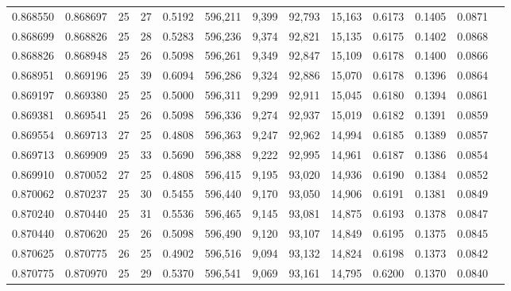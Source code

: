 \begin{tabular}{rrrrrrrrrrrrr}
0.868550 & 0.868697 &    25 &  27 &                                     0.5192 & 596,211 &   9,399 &  92,793 &  15,163 & 0.6173 & 0.1405 & 0.0871 \\
0.868699 & 0.868826 &    25 &  28 &                                     0.5283 & 596,236 &   9,374 &  92,821 &  15,135 & 0.6175 & 0.1402 & 0.0868 \\
0.868826 & 0.868948 &    25 &  26 &                                     0.5098 & 596,261 &   9,349 &  92,847 &  15,109 & 0.6178 & 0.1400 & 0.0866 \\
0.868951 & 0.869196 &    25 &  39 &                                     0.6094 & 596,286 &   9,324 &  92,886 &  15,070 & 0.6178 & 0.1396 & 0.0864 \\
0.869197 & 0.869380 &    25 &  25 &                                     0.5000 & 596,311 &   9,299 &  92,911 &  15,045 & 0.6180 & 0.1394 & 0.0861 \\
0.869381 & 0.869541 &    25 &  26 &                                     0.5098 & 596,336 &   9,274 &  92,937 &  15,019 & 0.6182 & 0.1391 & 0.0859 \\
0.869554 & 0.869713 &    27 &  25 &                                     0.4808 & 596,363 &   9,247 &  92,962 &  14,994 & 0.6185 & 0.1389 & 0.0857 \\
0.869713 & 0.869909 &    25 &  33 &                                     0.5690 & 596,388 &   9,222 &  92,995 &  14,961 & 0.6187 & 0.1386 & 0.0854 \\
0.869910 & 0.870052 &    27 &  25 &                                     0.4808 & 596,415 &   9,195 &  93,020 &  14,936 & 0.6190 & 0.1384 & 0.0852 \\
0.870062 & 0.870237 &    25 &  30 &                                     0.5455 & 596,440 &   9,170 &  93,050 &  14,906 & 0.6191 & 0.1381 & 0.0849 \\
0.870240 & 0.870440 &    25 &  31 &                                     0.5536 & 596,465 &   9,145 &  93,081 &  14,875 & 0.6193 & 0.1378 & 0.0847 \\
0.870440 & 0.870620 &    25 &  26 &                                     0.5098 & 596,490 &   9,120 &  93,107 &  14,849 & 0.6195 & 0.1375 & 0.0845 \\
0.870625 & 0.870775 &    26 &  25 &                                     0.4902 & 596,516 &   9,094 &  93,132 &  14,824 & 0.6198 & 0.1373 & 0.0842 \\
0.870775 & 0.870970 &    25 &  29 &                                     0.5370 & 596,541 &   9,069 &  93,161 &  14,795 & 0.6200 & 0.1370 & 0.0840 \\

\end{tabular}
